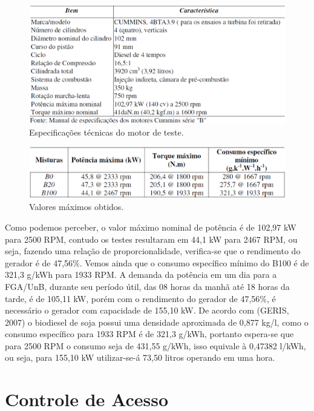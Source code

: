 \begin{figure}[!h]
  \centering
  \includegraphics[keepaspectratio=true,scale=0.5]{figuras/tabela_motor.eps}
  \caption{Especificações técnicas do motor de teste.}
  \label{fig:tabela_motor}
\end{figure}

\begin{figure}[!h]
  \centering
  \includegraphics[keepaspectratio=true,scale=0.5]{figuras/tabela_resultados.eps}
  \caption{Valores máximos obtidos.}
  \label{fig:tabela_resultados}
\end{figure}

Como podemos perceber, o valor máximo nominal de potência é de 102,97 kW para 2500 RPM, contudo os testes resultaram em 44,1 kW para 2467 RPM, ou seja, fazendo uma relação de proporcionalidade, verifica-se que o rendimento do gerador é de 47,56\%.
Vemos ainda que o consumo específico mínimo do B100 é de 321,3 g/kWh para 1933 RPM.
A demanda da potência em um dia para a FGA/UnB, durante seu período útil, das 08 horas da manhã até 18 horas da tarde, é de 105,11 kW, porém com o rendimento do gerador de 47,56\%, é necessário o gerador com capacidade de 155,10 kW.
De acordo com (GERIS, 2007) o biodiesel de soja possui uma densidade aproximada de 0,877 kg/l, como o consumo específico para 1933 RPM é de 321,3 g/kWh, portanto espera-se que para 2500 RPM o consumo seja de 431,55 g/kWh, isso equivale à 0,47382 l/kWh, ou seja, para 155,10 kW utilizar-se-á 73,50 litros operando em uma hora.

\chapter[Controle de Acesso]{Controle de Acesso}
